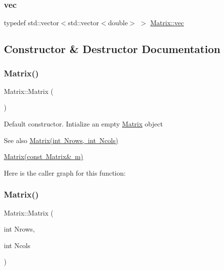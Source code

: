\subsubsection{\texorpdfstring{vec}{vec}}
{\footnotesize\ttfamily typedef std\+::vector$<$std\+::vector$<$double$>$ $>$ \mbox{\hyperlink{class_matrix_a0027109b5516f852be28259267c6c637}{Matrix\+::vec}}\hspace{0.3cm}{\ttfamily [private]}}



\subsection{Constructor \& Destructor Documentation}
\mbox{\label{class_matrix_a2dba13c45127354c9f75ef576f49269b}} 
\subsubsection{\texorpdfstring{Matrix()}{Matrix()}\hspace{0.1cm}{\footnotesize\ttfamily [1/3]}}
{\footnotesize\ttfamily Matrix\+::\+Matrix (\begin{DoxyParamCaption}{ }\end{DoxyParamCaption})}

Default constructor. Intialize an empty \mbox{\hyperlink{class_matrix}{Matrix}} object \begin{DoxySeeAlso}{See also}
\mbox{\hyperlink{class_matrix_a135a15de1126d735bb95fcc839d739d7}{Matrix(int Nrows, int Ncols)}} 

\mbox{\hyperlink{class_matrix_a765f4dcb51b6829311cc3e7576388423}{Matrix(const Matrix\& m)}} 
\end{DoxySeeAlso}
Here is the caller graph for this function\+:
\mbox{\label{class_matrix_a135a15de1126d735bb95fcc839d739d7}} 
\subsubsection{\texorpdfstring{Matrix()}{Matrix()}\hspace{0.1cm}{\footnotesize\ttfamily [2/3]}}
{\footnotesize\ttfamily Matrix\+::\+Matrix (\begin{DoxyParamCaption}\item[{int}]{Nrows,  }\item[{int}]{Ncols }\end{DoxyParamCaption})}


